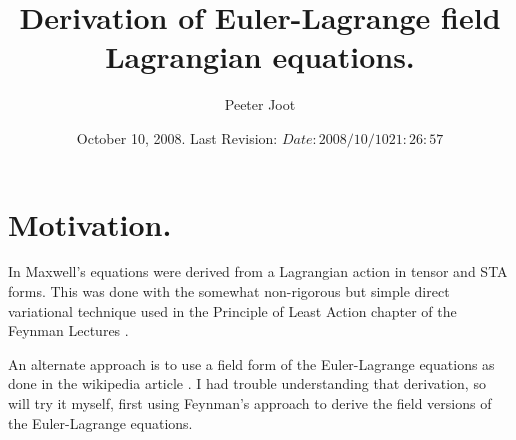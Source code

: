 \documentclass{article}
\title{ Derivation of Euler-Lagrange field Lagrangian equations.}
\author{Peeter Joot}
\date{ October 10, 2008.  Last Revision: $Date: 2008/10/10 21:26:57 $ }
\begin{document}
\maketitle{}

\tableofcontents

\section{ Motivation. }

In \cite{PJMaxwellLagrangian} Maxwell's equations were derived from
a Lagrangian action in tensor and STA forms.  This was done with 
the somewhat non-rigorous but simple direct variational technique used in
the Principle of Least Action chapter of the Feynman Lectures
\cite{feynman1963flp}.

An alternate approach is to use a field form of the Euler-Lagrange
equations as done in the wikipedia article \cite{wikiemtensor}.  I had
trouble understanding that derivation, so will try it myself, first
using Feynman's approach to derive the field versions of the Euler-Lagrange
equations.

\section{ }

\end{document}
